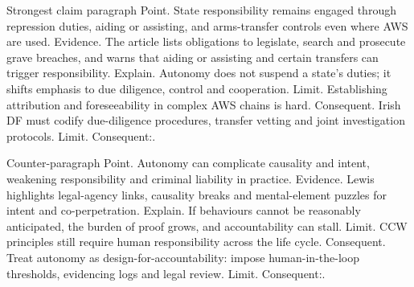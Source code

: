 Strongest claim paragraph
Point. State responsibility remains engaged through repression duties, aiding or assisting, and arms-transfer controls even where AWS are used.
Evidence. The article lists obligations to legislate, search and prosecute grave breaches, and warns that aiding or assisting and certain transfers can trigger responsibility.
Explain. Autonomy does not suspend a state’s duties; it shifts emphasis to due diligence, control and cooperation.
Limit. Establishing attribution and foreseeability in complex AWS chains is hard.
Consequent. Irish DF must codify due-diligence procedures, transfer vetting and joint investigation protocols. Limit. Consequent:.

Counter-paragraph
Point. Autonomy can complicate causality and intent, weakening responsibility and criminal liability in practice.
Evidence. Lewis highlights legal-agency links, causality breaks and mental-element puzzles for intent and co-perpetration.
Explain. If behaviours cannot be reasonably anticipated, the burden of proof grows, and accountability can stall.
Limit. CCW principles still require human responsibility across the life cycle.
Consequent. Treat autonomy as design-for-accountability: impose human-in-the-loop thresholds, evidencing logs and legal review. Limit. Consequent:.


